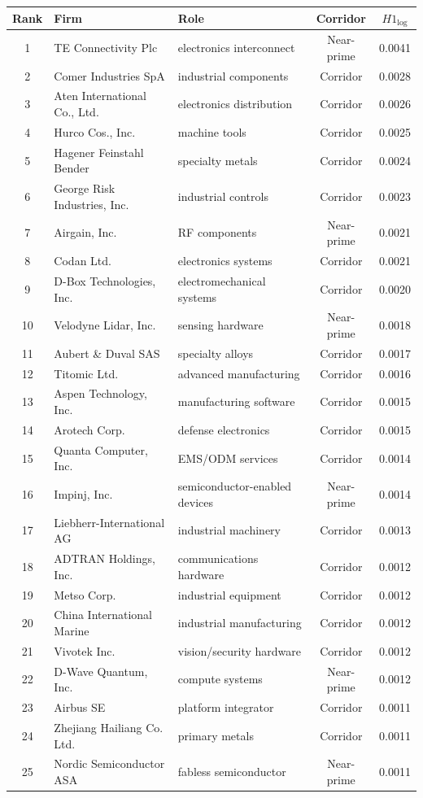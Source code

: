 \begin{tabularx}{\textwidth}{@{}c
  >{\hsize\raggedright\arraybackslash}X
  >{\hsize\raggedright\arraybackslash}X
  c
  S[table-format=1.4]@{}}
\toprule
Rank & Firm & Role & Corridor & {$H1_{\log}$} \\
  & TE Connectivity Plc & electronics interconnect & Near-prime & 0.0041 \\
2  & Comer Industries SpA & industrial components & Corridor & 0.0028 \\
3  & Aten International Co., Ltd. & electronics distribution & Corridor & 0.0026 \\
4  & Hurco Cos., Inc. & machine tools & Corridor & 0.0025 \\
5  & Hagener Feinstahl Bender & specialty metals & Corridor & 0.0024 \\
6  & George Risk Industries, Inc. & industrial controls & Corridor & 0.0023 \\
7  & Airgain, Inc. & RF components & Near-prime & 0.0021 \\
8  & Codan Ltd. & electronics systems & Corridor & 0.0021 \\
9  & D-Box Technologies, Inc. & electromechanical systems & Corridor & 0.0020 \\
10 & Velodyne Lidar, Inc. & sensing hardware & Near-prime & 0.0018 \\
11 & Aubert \& Duval SAS & specialty alloys & Corridor & 0.0017 \\
12 & Titomic Ltd. & advanced manufacturing & Corridor & 0.0016 \\
13 & Aspen Technology, Inc. & manufacturing software & Corridor & 0.0015 \\
14 & Arotech Corp. & defense electronics & Corridor & 0.0015 \\
15 & Quanta Computer, Inc. & EMS/ODM services & Corridor & 0.0014 \\
16 & Impinj, Inc. & semiconductor-enabled devices & Near-prime & 0.0014 \\
17 & Liebherr-International AG & industrial machinery & Corridor & 0.0013 \\
18 & ADTRAN Holdings, Inc. & communications hardware & Corridor & 0.0012 \\
19 & Metso Corp. & industrial equipment & Corridor & 0.0012 \\
20 & China International Marine & industrial manufacturing & Corridor & 0.0012 \\
21 & Vivotek Inc. & vision/security hardware & Corridor & 0.0012 \\
22 & D-Wave Quantum, Inc. & compute systems & Near-prime & 0.0012 \\
23 & Airbus SE & platform integrator & Corridor & 0.0011 \\
24 & Zhejiang Hailiang Co. Ltd. & primary metals & Corridor & 0.0011 \\
25 & Nordic Semiconductor ASA & fabless semiconductor & Near-prime & 0.0011 \\
\bottomrule
\end{tabularx}
